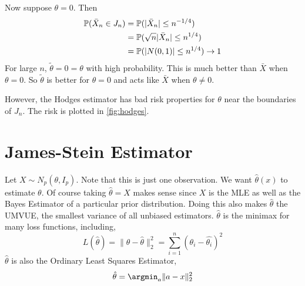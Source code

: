 \documentclass[10pt]{article}
\begin{document}
Now suppose $\theta = 0$. Then
\begin{align*}
  \P(\bar{X}_n \in J_n) &= \P(|\bar{X}_n| \leq n^{-1/4})\\
  &= \P(\sqrt{n} |\bar{X}_n| \leq n^{1/4})\\
  &=\P(|N(0,1)| \leq n^{1/4}) \rightarrow 1
\end{align*}
For large $n$, $\tilde{\theta} = 0 = \theta$ with high probability.
This is much better than $\bar{X}$ when $\theta = 0$. So
$\tilde{\theta}$ is better for $\theta=0$ and acts like
$\bar{X}$ when $\theta \neq 0$.

However, the Hodges estimator has bad risk properties for $\theta$
near the boundaries of $J_n$. The risk is plotted in
\autoref{fig:hodges}.


\section{James-Stein Estimator}
\label{sec:convergence}

Let $X \sim N_p(\theta,I_p)$. Note that this is just one observation. We
want $\hat{\theta}(x)$ to estimate $\theta$. Of course taking
$\hat{\theta}=X$ makes sense since $X$ is 
the MLE as well as
the Bayes Estimator of a particular prior distribution. Doing this
also makes $\hat{\theta}$ the UMVUE, the smallest variance of all
unbiased estimators. $\hat{\theta}$ is the minimax for many loss
functions, including, 
\begin{equation}
  L(\hat{\theta}) = \| \theta - \hat{\theta} \|^2_2 = \sum^n_{i = 1}(\theta_i - \hat{\theta_i})^2
\end{equation}
$\hat{\theta}$ is also the Ordinary Least Squares Estimator,
\begin{equation}
  \hat{\theta} = \argmin_a \|a-x\|^2_2
\end{equation}
\end{document}
